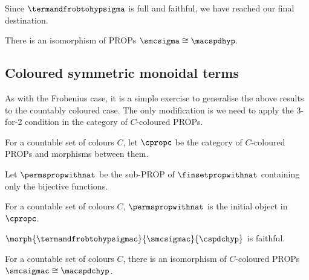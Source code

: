 Since \(\termandfrobtohypsigma\) is full and faithful, we have reached our
final destination.

\begin{corollary}
    There is an isomorphism of PROPs \(\smcsigma \cong \macspdhyp\).
\end{corollary}

\subsection{Coloured symmetric monoidal terms}

As with the Frobenius case, it is a simple exercise to generalise the above
results to the countably coloured case.
The only modification is we need to apply the 3-for-2 condition in the
category of \(C\)-coloured PROPs.

\begin{definition}
    For a countable set of colours \(C\), let \(\cpropc\) be the category of
    \(C\)-coloured PROPs and morphisms between them.
\end{definition}

\begin{lemma}
    Let \(\permspropwithnat\) be the sub-PROP of \(\finsetpropwithnat\)
    containing only the bijective functions.
\end{lemma}

\begin{lemma}
    For a countable set of colours \(C\), \(\permspropwithnat\) is the initial
    object in \(\cpropc\).
\end{lemma}

\begin{proposition}
    \(\morph{\termandfrobtohypsigmac}{\smcsigmac}{\cspdchyp}\) is faithful.
\end{proposition}

\begin{corollary}
    For a countable set of colours \(C\), there is an isomorphism of
    \(C\)-coloured PROPs \(\smcsigmac \cong \macspdchyp\).
\end{corollary}